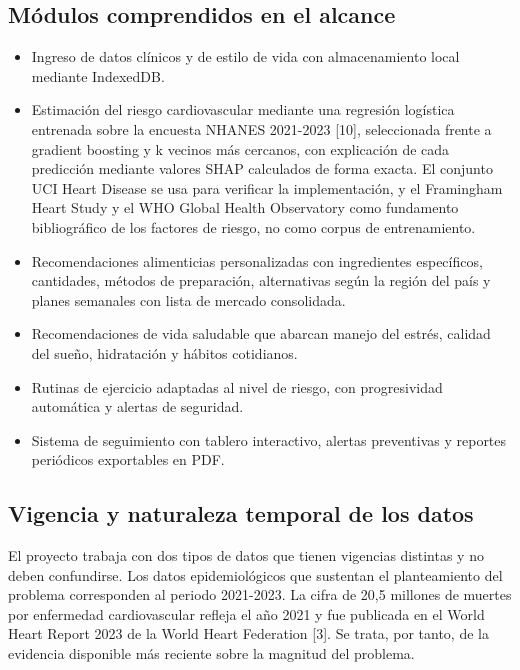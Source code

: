 \documentclass[conference]{IEEEtran}
\begin{document}
\subsection{Módulos comprendidos en el alcance}
\begin{itemize}
\item Ingreso de datos clínicos y de estilo de vida con almacenamiento local mediante IndexedDB.
\item Estimación del riesgo cardiovascular mediante una regresión logística entrenada sobre la encuesta NHANES 2021-2023 [10], seleccionada frente a gradient boosting y k vecinos más cercanos, con explicación de cada predicción mediante valores SHAP calculados de forma exacta. El conjunto UCI Heart Disease se usa para verificar la implementación, y el Framingham Heart Study y el WHO Global Health Observatory como fundamento bibliográfico de los factores de riesgo, no como corpus de entrenamiento.
\item Recomendaciones alimenticias personalizadas con ingredientes específicos, cantidades, métodos de preparación, alternativas según la región del país y planes semanales con lista de mercado consolidada.
\item Recomendaciones de vida saludable que abarcan manejo del estrés, calidad del sueño, hidratación y hábitos cotidianos.
\item Rutinas de ejercicio adaptadas al nivel de riesgo, con progresividad automática y alertas de seguridad.
\item Sistema de seguimiento con tablero interactivo, alertas preventivas y reportes periódicos exportables en PDF.
\end{itemize}
\subsection{Vigencia y naturaleza temporal de los datos}
El proyecto trabaja con dos tipos de datos que tienen vigencias distintas y no deben confundirse. Los datos epidemiológicos que sustentan el planteamiento del problema corresponden al periodo 2021-2023. La cifra de 20{,}5 millones de muertes por enfermedad cardiovascular refleja el año 2021 y fue publicada en el World Heart Report 2023 de la World Heart Federation [3]. Se trata, por tanto, de la evidencia disponible más reciente sobre la magnitud del problema.
\end{document}
